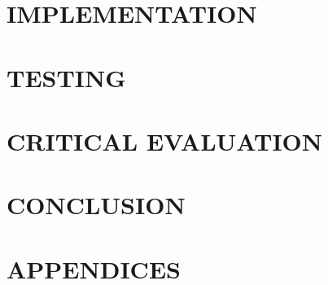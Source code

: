 \documentclass[12pt,a4paper,oneside]{report}
\begin{document}
\chapter{IMPLEMENTATION}
\renewcommand{\currentchapter}{IMPLEMENTATION}


\chapter{TESTING}
\renewcommand{\currentchapter}{TESTING}


\chapter{CRITICAL EVALUATION}
\renewcommand{\currentchapter}{CRITICAL EVALUATION}


\chapter{CONCLUSION}
\renewcommand{\currentchapter}{CONCLUSION}




\chapter*{APPENDICES}
\renewcommand{\currentchapter}{APPENDICES}

\end{document}
